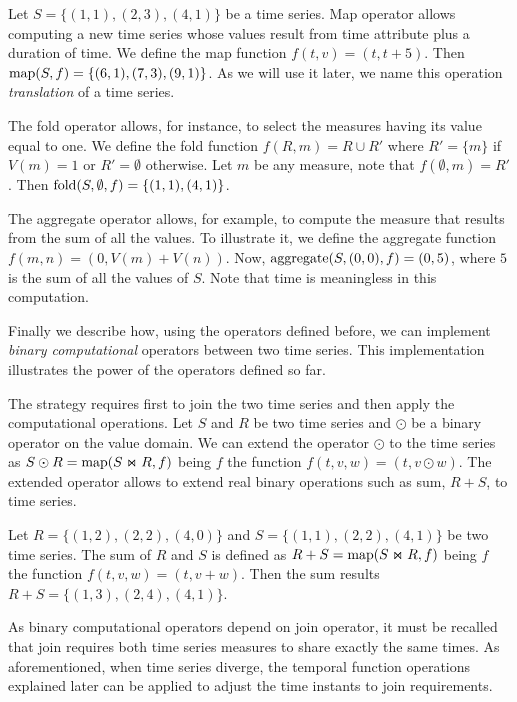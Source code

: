 \begin{example}
\label{ex:computational-operators}
Let $S=\{(1,1),(2,3),(4,1)\}$ be a time series.  Map operator allows
computing a new time series whose values result from time attribute
plus a duration of time.  We define the map function
$f(t,v)=(t,t+5)$. Then $\operatorname*{map}(S,f)=\{(6,1),(7,3),(9,1)\}$. As we will
use it later, we name this operation \emph{translation} of a time
series.
%

The fold operator allows, for instance, to select the measures having
its value equal to one.  We define the fold function $f(R,m)=R\cup R'$
where $R'=\{m\}$ if $V(m)=1$ or $R'=\emptyset$ otherwise. Let $m$ be
any measure, note that $f(\emptyset,m)= R'$. Then
$\operatorname*{fold}(S,\emptyset,f)=\{(1,1),(4,1)\}$.


The aggregate operator allows, for example, to compute the measure
that results from the sum of all the values.  To illustrate it, we
define the aggregate function $f(m,n)=(0,V(m)+V(n))$. Now,
$\operatorname*{aggregate}(S,(0,0),f) = (0,5)$, where $5$ is the sum of all the values of
$S$. Note that time is meaningless in this computation.
\end{example}




Finally we describe how, using the operators defined before, we can
implement \emph{binary computational} operators between two time
series. This implementation illustrates the power of the operators
defined so far.

The strategy requires first to join the two time series and then apply
the computational operations. Let $S$ and $R$ be two time series and
$\odot$ be a binary operator on the value domain. We can extend the
operator $\odot$ to the time series as $S\odot R=\operatorname*{map}(S\Join R, f)$
being $f$ the function $f(t,v,w)=(t,v\odot w)$. The extended operator
allows to extend real binary operations such as sum, $R+S$, to time
series.

\begin{example}
  \label{ex:model:sum}
  Let $R=\{(1,2), (2,2), (4,0)\}$ and $S=\{(1,1), (2,2), (4,1)\}$ be
  two time series.  The sum of $R$ and $S$ is defined as
  $R+S=\operatorname*{map}(S\Join R, f)$ being $f$ the function $f(t,v,w)=(t,v+ w)$.
  Then the sum results $R+S= \{(1,3), (2,4), (4,1)\}$.
\end{example}

As binary computational operators depend on join operator, it must be
recalled that join requires both time series measures to share exactly
the same times. As aforementioned, when time series diverge, the
temporal function operations explained later can be applied to adjust
the time instants to join requirements.



